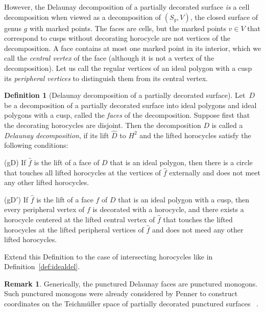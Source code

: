 \documentclass[a4paper, 11pt]{article}
\newcommand{\Tm}{Teich\-m{\"u}l\-ler}
\theoremstyle{plain}
\theoremstyle{definition}
\newtheorem{definition}[theorem]{Definition}
\newtheorem{remark}[theorem]{Remark}
\begin{document}
However, the Delaunay decomposition of a partially decorated surface
\emph{is} a cell decomposition when viewed as a decomposition of
$(S_{g},V)$, the closed surface of genus $g$ with marked points. The
faces are cells, but the marked points $v\in V$ that correspond to
cusps without decorating horocycle are not vertices of the
decomposition. A face contains at most one marked point in its
interior, which we call the \emph{central vertex} of the face
(although it is not a vertex of the decomposition). Let us call the
regular vertices of an ideal polygon with a cusp its \emph{peripheral
  vertices} to distinguish them from its central vertex.

\begin{definition}[Delaunay decomposition of a partially
  decorated surface]
  \label{def:delpart}
  Let~$D$ be a decomposition of a partially decorated surface into
  ideal polygons and ideal polygons with a cusp, called the
  \emph{faces} of the decomposition. Suppose first that the decorating
  horocycles are disjoint. Then the decomposition $D$ is called a
  \emph{Delaunay decomposition}, if its lift $\hat{D}$ to $H^{2}$ and
  the lifted horocycles satisfy the following conditions:
  \begin{compactitem}[(gD$'$)]
  \item[(gD)] If $\hat{f}$ is the lift of a face of $D$ that is an ideal
    polygon, then there is a circle that touches all lifted horocycles
    at the vertices of $\hat{f}$ externally and does not meet any
    other lifted horocycles. 
  \item[(gD$'$)] If $\hat{f}$ is the lift of a face $f$ of $D$ that is
    an ideal polygon with a cusp, then every peripheral vertex of $f$
    is decorated with a horocycle, and there exists a horocycle
    centered at the lifted central vertex of $\hat{f}$ that touches
    the lifted horocycles at the lifted peripheral vertices of
    $\hat{f}$ and does not meed any other lifted horocycles.
  \end{compactitem}
  Extend this Definition to the case of intersecting horocycles like
  in Definition~\ref{def:idealdel}.
\end{definition}

\begin{remark}
  Generically, the punctured Delaunay faces are punctured
  monogons. Such punctured monogons were already considered by Penner
  to construct coordinates on the \Tm{} space of partially decorated
  punctured surfaces~\cite[Addendum]{penner87} \cite[Sec.~5.1]{penner12}.
\end{remark}
\end{document}
